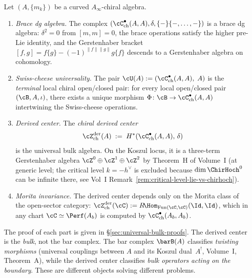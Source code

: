 \begin{theorem}
\label{thm:universal-bulk}
Let $(A, \{m_k\})$ be a curved $A_\infty$-chiral algebra.
\begin{enumerate}[label=\textup{(\roman*)}]
\item \emph{Brace dg algebra.} The complex
 $(\cC^\bullet_{\mathrm{ch}}(A, A), \delta, \{-\}\{-,\ldots,-\})$
 is a brace dg algebra: $\delta^2 = 0$ from $[m,m] = 0$, the
 brace operations satisfy the higher pre-Lie identity, and the
 Gerstenhaber bracket $[f,g] = f\{g\} - (-1)^{\|f\|\|g\|} g\{f\}$
 descends to a Gerstenhaber algebra on cohomology.

\item \emph{Swiss-cheese universality.}
 The pair $\cU(A) := (\cC^\bullet_{\mathrm{ch}}(A, A),\; A)$
 is the \emph{terminal} local chiral open/closed pair: for every
 local open/closed pair $(\cB, A, \iota)$, there exists a unique
 morphism $\Phi \colon \cB \to \cC^\bullet_{\mathrm{ch}}(A,A)$
 intertwining the Swiss-cheese operations.

\item \emph{Derived center.} The \emph{chiral derived center}
 \[
 \cZ^{\mathrm{der}}_{\mathrm{ch}}(A)
 \;:=\;
 H^*(\cC^\bullet_{\mathrm{ch}}(A, A),\, \delta)
 \]
 is the universal bulk algebra. On the Koszul locus, it is a
 three-term Gerstenhaber algebra
 $\cZ^0 \oplus \cZ^1 \oplus \cZ^2$
 by Theorem~H of Volume~I (at generic level; the critical level
 $k = -h^\vee$ is excluded because $\dim \ChirHoch^0$ can be
 infinite there, see Vol~I Remark~\ref*{rem:critical-level-lie-vs-chirhoch}).

\item \emph{Morita invariance.}
 The derived center depends only on the Morita class of the
 open-sector category:
 $\cZ^{\mathrm{der}}_{\mathrm{ch}}(\cC)
 := R\!\Hom_{\operatorname{Fun}(\cC,\cC)}(\Id, \Id)$,
 which in any chart $\cC \simeq \Perf(A_b)$ is computed by
 $\cC^\bullet_{\mathrm{ch}}(A_b, A_b)$.
\end{enumerate}
\end{theorem}

The proof of each part is given in
\S\ref{sec:universal-bulk-proofs}. The
derived center is the \emph{bulk}, not the bar complex.
The bar complex $\barB(A)$ classifies \emph{twisting morphisms}
(universal couplings between $A$ and its Koszul dual~$A^!$,
Volume~I, Theorem~A), while the derived center classifies
\emph{bulk operators acting on the boundary}. These are different
objects solving different problems.

